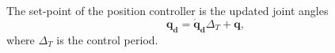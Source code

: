 The set-point of the position controller is the updated joint angles
\begin{equation}
    \bm{q_d}=\bm{\dot{q}_d}\Delta_T+\bm{q},
\label{anglejointsreference}
\end{equation}
where $\Delta_T$ is the control period.







